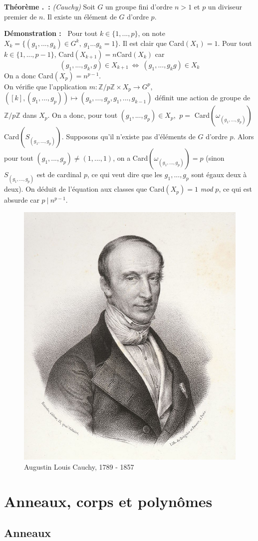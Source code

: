 \documentclass[5pt,a4paper]{article}
\newcounter{thmcounter}[subsection]
\renewcommand{\thethmcounter}{\thesubsection.\arabic{thmcounter}}
\newcommand{\thm}[1]{
    \stepcounter{thmcounter}
    \hypertarget{t:\thethmcounter}{}%
    \noindent\textbf{Théorème \thethmcounter ~:} #1 \newline
}
\newcommand{\demo}[1]{
    \textbf{Démonstration :~} #1 \newline
}
\begin{document}
\begin{onehalfspacing}
\thm{\textit{(Cauchy)} Soit $G$ un groupe fini d'ordre $n > 1$ et $p$ un diviseur premier de $n$. Il existe un élément de $G$ d'ordre $p$.}
\demo{Pour tout $k \in \{1, ..., p\}$, on note $X_k = \{(g_1, ..., g_k) \in G^k,~g_1...g_k = 1\}$. Il est clair que Card$(X_1) = 1$. Pour tout $k \in \{1, ..., p-1\}$, Card$(X_{k+1}) = n$Card$(X_k)$ car
\[ (g_1, ..., g_k, g) \in X_{k+1}~\Leftrightarrow~(g_1, ..., g_kg) \in X_k \] On a donc Card$(X_p) = n^{p-1}$. \\
On vérifie que l'application $m : \mathbb{Z}/p\mathbb{Z} \times X_p \rightarrow G^p$, $([k], (g_1, ..., g_p)) \mapsto (g_k, ..., g_p, g_1, ..., g_{k-1})$ définit une action de groupe de $\mathbb{Z}/p\mathbb{Z}$ dans $X_p$. On a donc, pour tout $(g_1, ..., g_p) \in X_p$, $~p =$ Card$(\omega_{(g_1, ..., g_p)})$Card$(S_{(g_1, ..., g_p)})$.
Supposons qu'il n'existe pas d'éléments de $G$ d'ordre $p$. Alors pour tout $(g_1, ..., g_p) \neq (1, ..., 1)$, on a Card$(\omega_{(g_1, ..., g_p)}) = p$ (sinon $S_{(g_1, ..., g_p)}$ est de cardinal $p$, ce qui veut dire que les $g_1, ..., g_p$ sont égaux deux à deux). On déduit de l'équation aux classes que Card$(X_p) = 1$ \textit{mod} $p$, ce qui est absurde car $p ~|~ n^{p-1}$.}

\begin{figure}[!h]
\centering
\includegraphics[width = 0.286\linewidth]{ressources/cauchy.jpg}
\caption{Augustin Louis Cauchy, 1789 - 1857}
\end{figure}

\newpage
\section{Anneaux, corps et polynômes}

\subsection{Anneaux}


\end{onehalfspacing}
\end{document}

